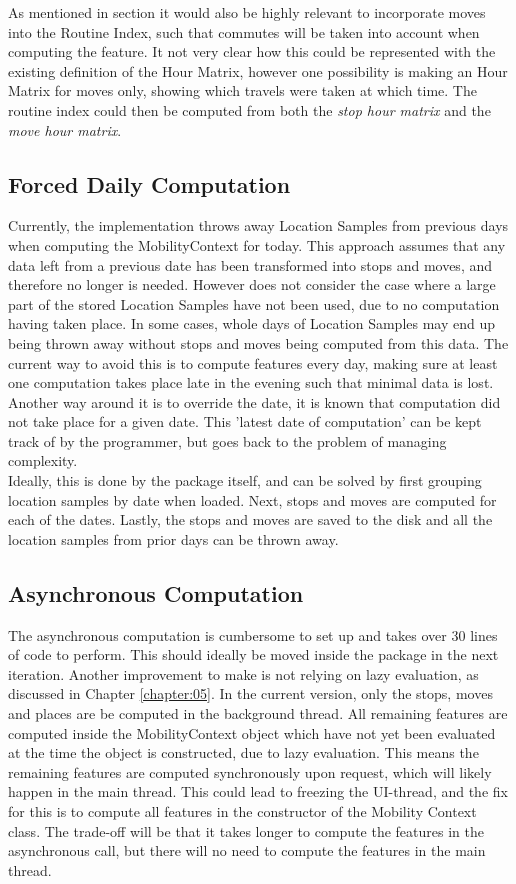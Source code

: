 As mentioned in section \label{sub:routine-index} it would also be highly relevant to incorporate moves into the Routine Index, such that commutes will be taken into account when computing the feature. It not very clear how this could be represented with the existing definition of the Hour Matrix, however one possibility is making an Hour Matrix for moves only, showing which travels were taken at which time. The routine index could then be computed from both the \textit{stop hour matrix} and the \textit{move hour matrix}.

\subsection{Forced Daily Computation}
Currently, the implementation throws away Location Samples from previous days when computing the MobilityContext for today. This approach assumes that any data left from a previous date has been transformed into stops and moves, and therefore no longer is needed. However does not consider the case where a large part of the stored Location Samples have not been used, due to no computation having taken place. In some cases, whole days of Location Samples may end up being thrown away without stops and moves being computed from this data. The current way to avoid this is to compute features every day, making sure at least one computation takes place late in the evening such that minimal data is lost. Another way around it is to override the date, it is known that computation did not take place for a given date. This 'latest date of computation' can be kept track of by the programmer, but goes back to the problem of managing complexity. \\

Ideally, this is done by the package itself, and can be solved by first grouping location samples by date when loaded. Next, stops and moves are computed for each of the dates. Lastly, the stops and moves are saved to the disk and all the location samples from prior days can be thrown away.

\subsection{Asynchronous Computation}
The asynchronous computation is cumbersome to set up and takes over 30 lines of code to perform. This should ideally be moved inside the package in the next iteration. Another improvement to make is not relying on lazy evaluation, as discussed in Chapter \ref{chapter:05}. In the current version, only the stops, moves and places are be computed in the background thread. All remaining features are computed inside the MobilityContext object which have not yet been evaluated at the time the object is constructed, due to lazy evaluation. This means the remaining features are computed synchronously upon request, which will likely happen in the main thread. This could lead to freezing the UI-thread, and the fix for this is to compute all features in the constructor of the Mobility Context class. The trade-off will be that it takes longer to compute the features in the asynchronous call, but there will no need to compute the features in the main thread.

